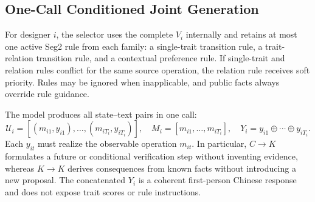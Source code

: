 \subsection{One-Call Conditioned Joint Generation}

For designer $i$, the selector uses the complete $V_i$ internally and retains
at most one active Seg2 rule from each family: a single-trait transition rule,
a trait-relation transition rule, and a contextual preference rule. If
single-trait and relation rules conflict for the same source operation, the
relation rule receives soft priority. Rules may be ignored when inapplicable,
and public facts always override rule guidance.

The model produces all state--text pairs in one call:
\begin{equation}
\mathcal U_i=[(m_{i1},y_{i1}),\ldots,(m_{iT_i},y_{iT_i})],
\quad
M_i=[m_{i1},\ldots,m_{iT_i}],
\quad
Y_i=y_{i1}\oplus\cdots\oplus y_{iT_i}.
\end{equation}
Each $y_{it}$ must realize the observable operation $m_{it}$. In particular,
$C\!\rightarrow\!K$ formulates a future or conditional verification step
without inventing evidence, whereas $K\!\rightarrow\!K$ derives consequences
from known facts without introducing a new proposal. The concatenated
$Y_i$ is a coherent first-person Chinese response and does not expose trait
scores or rule instructions.
